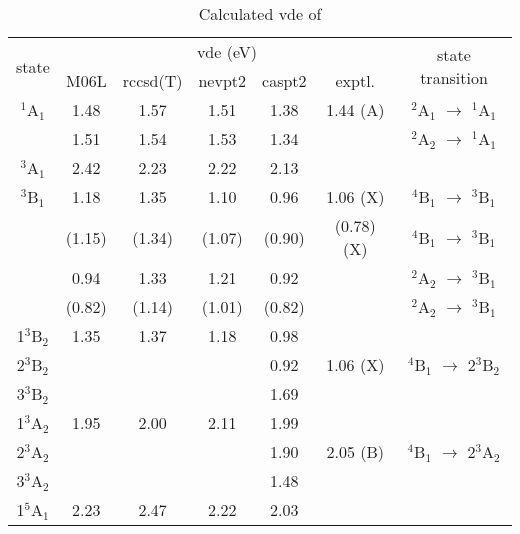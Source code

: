 \begin{refsection}
\begin{table}[htb!]
	\centering
	\begin{threeparttable}
	\caption{Calculated \acrshort{vde} of }
	\label{tbl4:DE}
	\begin{tabular}{@{}ccccccc@{}}
	\toprule
	\multirow{2}{*}{state} & \multicolumn{5}{c}{\acrshort{vde} (eV)\tnote{(b)}}                   & \multirow{2}{*}{state transition} \\ \cmidrule(l){2-6} 
				  & M06L   & \acrshort{rccsd}(T) & \acrshort{nevpt2} & \acrshort{caspt2} & exptl.     &                  \\ \midrule
	$^1$A$_1$     & 1.48   & 1.57     & 1.51   & 1.38   & 1.44 (A)   & $^2$A$_1$ $\longrightarrow$ $^1$A$_1$        \\
				  & 1.51   & 1.54     & 1.53   & 1.34   &            & $^2$A$_2$ $\longrightarrow$ $^1$A$_1$        \\
	$^3$A$_1$     & 2.42   & 2.23     & 2.22   & 2.13   &            &                  \\
	$^3$B$_1$     & 1.18   & 1.35     & 1.10   & 0.96   & 1.06  (X)  & $^4$B$_1$ $\longrightarrow$ $^3$B$_1$        \\
				  & (1.15) & (1.34)   & (1.07) & (0.90) & (0.78) (X) & $^4$B$_1$ $\longrightarrow$ $^3$B$_1$        \\
				  & 0.94   & 1.33     & 1.21   & 0.92   &            & $^2$A$_2$ $\longrightarrow$ $^3$B$_1$        \\
				  & (0.82) & (1.14)   & (1.01) & (0.82) &            & $^2$A$_2$ $\longrightarrow$ $^3$B$_1$        \\
	1$^3$B$_2$    & 1.35   & 1.37     & 1.18   & 0.98   &            &                  \\
	2$^3$B$_2$    &        &          &        & 0.92   & 1.06 (X)   & $^4$B$_1$ $\longrightarrow$ 2$^3$B$_2$       \\
	3$^3$B$_2$    &        &          &        & 1.69   &            &                  \\
	1$^3$A$_2$    & 1.95   & 2.00     & 2.11   & 1.99   &            &                  \\
	2$^3$A$_2$    &        &          &        & 1.90   & 2.05 (B)   & $^4$B$_1$ $\longrightarrow$ 2$^3$A$_2$       \\
	3$^3$A$_2$    &        &          &        & 1.48   &            &                  \\
	1$^5$A$_1$    & 2.23   & 2.47     & 2.22   & 2.03   &            &                  \\

\end{tabular}
\end{threeparttable}
\end{table}
\end{refsection}
